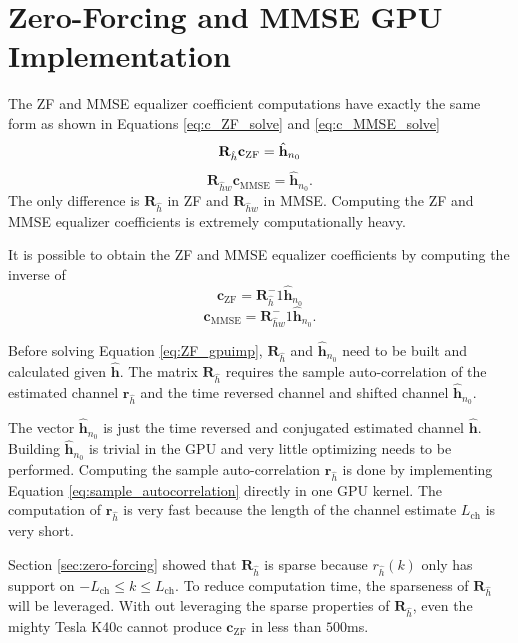\section{Zero-Forcing and MMSE GPU Implementation}
The ZF and MMSE equalizer coefficient computations have exactly the same form as shown in Equations \ref{eq:c_ZF_solve} and \ref{eq:c_MMSE_solve}
\begin{equation}
\mathbf{R}_{\hat{h}} \mathbf{c}_\text{ZF} = \hat{\mathbf{h}}_{n_0}\\
\label{eq:ZF_gpuimp}
\end{equation}
\begin{equation}
\mathbf{R}_{\hat{h}w} \mathbf{c}_\text{MMSE} = \hat{\mathbf{h}}_{n_0}.
\label{eq:MMSE_gpuimp}
\end{equation}
The only difference is $\mathbf{R}_{\hat{h}}$ in ZF and $\mathbf{R}_{\hat{h}w}$ in MMSE.
Computing the ZF and MMSE equalizer coefficients is extremely computationally heavy.

It is possible to obtain the ZF and MMSE equalizer coefficients by computing the inverse of 
\begin{equation}
 \mathbf{c}_\text{ZF} = \mathbf{R}_{\hat{h}}^-1\hat{\mathbf{h}}_{n_0}
\label{eq:ZF_gpuimp}
\end{equation}
\begin{equation}
 \mathbf{c}_\text{MMSE} = \mathbf{R}_{\hat{h}w}^-1 \hat{\mathbf{h}}_{n_0}.
\label{eq:MMSE_gpuimp}
\end{equation}

Before solving Equation \ref{eq:ZF_gpuimp}, $\mathbf{R}_{\hat{h}}$ and $\hat{\mathbf{h}}_{n_0}$ need to be built and calculated given $\hat{\mathbf{h}}$.
The matrix $\mathbf{R}_{\hat{h}}$ requires the sample auto-correlation of the estimated channel $\mathbf{r}_{\hat{h}}$ and the time reversed channel and shifted channel $\hat{\mathbf{h}}_{n_0}$.

The vector $\hat{\mathbf{h}}_{n_0}$ is just the time reversed and conjugated estimated channel $\hat{\mathbf{h}}$. Building $\hat{\mathbf{h}}_{n_0}$ is trivial in the GPU and very little optimizing needs to be performed.
Computing the sample auto-correlation $\mathbf{r}_{\hat{h}}$ is done by implementing Equation \ref{eq:sample_autocorrelation} directly in one GPU kernel.
The computation of $\mathbf{r}_{\hat{h}}$ is very fast because the length of the channel estimate $L_{\text{ch}}$ is very short.

Section \ref{sec:zero-forcing} showed that $\mathbf{R}_{\hat{h}}$ is sparse because $r_{\hat{h}}(k)$ only has support on $-L_{\text{ch}} \leq k \leq L_{\text{ch}}$. 
To reduce computation time, the sparseness of $\mathbf{R}_{\hat{h}}$ will be leveraged. 
With out leveraging the sparse properties of $\mathbf{R}_{\hat{h}}$, even the mighty Tesla K40c cannot produce $\mathbf{c}_\text{ZF}$ in less than $500$ms.

